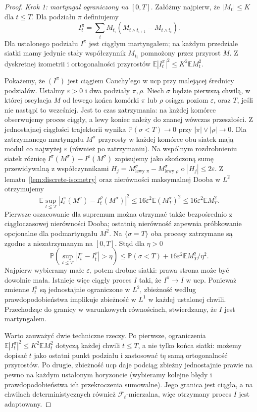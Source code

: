 \documentclass[11pt,a4paper,oneside]{report}
\numberwithin{equation}{chapter}
\theoremstyle{plain}
\theoremstyle{definition}
\theoremstyle{remark}
\newcommand{\Prob}{\mathbb{P}}
\newcommand{\E}{\mathbb{E}}
\newcommand{\calF}{\mathcal{F}}
\begin{document}
\begin{proof}
\emph{Krok 1: martyngał ograniczony na $[0,T]$.}
Załóżmy najpierw, że $|M_t|\le K$ dla $t\le T$.
Dla podziału $\pi$ definiujemy
\[
I_t^\pi=\sum_i M_{t_i}
(M_{t\wedge t_{i+1}}-M_{t\wedge t_i}).
\]
Dla ustalonego podziału $I^\pi$ jest ciągłym martyngałem;
na każdym przedziale siatki mamy jedynie stały
współczynnik $M_{t_i}$ pomnożony przez przyrost $M$.
Z dyskretnej izometrii i ortogonalności przyrostów
$\E|I_t^\pi|^2\le K^2\E M_t^2$.

Pokażemy, że $(I^\pi)$ jest ciągiem Cauchy'ego w
ucp przy malejącej średnicy podziałów. Ustalmy
$\varepsilon>0$ i dwa podziały $\pi,\rho$.
Niech $\sigma$ będzie pierwszą chwilą, w której
oscylacja $M$ od lewego końca komórki $\pi$ lub
$\rho$ osiąga poziom $\varepsilon$, oraz $T$,
jeśli nie nastąpi to wcześniej. Jest to czas zatrzymania:
na każdej komórce obserwujemy proces ciągły,
a lewy koniec należy do znanej wówczas przeszłości.
Z jednostajnej ciągłości trajektorii wynika
$\Prob(\sigma<T)\to0$ przy
$|\pi|\vee|\rho|\to0$.
Dla zatrzymanego martyngału $M^\sigma$ przyrosty
w każdej komórce obu siatek mają moduł co najwyżej
$\varepsilon$ (również po zatrzymaniu).
Na wspólnym rozdrobnieniu siatek różnicę
$I^\pi(M^\sigma)-I^\rho(M^\sigma)$ zapisujemy jako
skończoną sumę przewidywalną z współczynnikami
$H_j=M^\sigma_{\text{lewy }\pi}-
M^\sigma_{\text{lewy }\rho}$ o $|H_j|\le2\varepsilon$.
Z lematu~\ref{lem:discrete-isometry} oraz nierówności
maksymalnej Dooba w $L^2$ otrzymujemy
\[
\E\sup_{t\le T}|I_t^\pi(M^\sigma)-
I_t^\rho(M^\sigma)|^2
\le16\varepsilon^2\E (M^\sigma_T)^2
\le16\varepsilon^2\E M_T^2.
\]
Pierwsze oszacowanie dla supremum można otrzymać także
bezpośrednio z ciągłoczasowej nierówności Dooba;
ostatnią nierówność zapewnia próbkowanie opcjonalne
dla podmartyngału $M^2$.
Na $\{\sigma=T\}$ oba procesy zatrzymane są zgodne
z niezatrzymanym na $[0,T]$. Stąd dla $\eta>0$
\[
\Prob\left(\sup_{t\le T}|I_t^\pi-I_t^\rho|>\eta\right)
\le\Prob(\sigma<T)+16\varepsilon^2\E M_T^2/\eta^2.
\]
Najpierw wybieramy małe $\varepsilon$, potem drobne
siatki: prawa strona może być dowolnie mała.
Istnieje więc ciągły proces $I$ taki, że
$I^\pi\to I$ w ucp.
Ponieważ zmienne $I_t^\pi$ są jednostajnie ograniczone
w $L^2$, zbieżność według prawdopodobieństwa implikuje
zbieżność w $L^1$ w każdej ustalonej chwili.
Przechodząc do granicy w warunkowych równościach,
stwierdzamy, że $I$ jest martyngałem.


Warto zauważyć dwie techniczne rzeczy. Po pierwsze, ograniczenia
$\E|I_t^\pi|^2\le K^2\E M_t^2$ dotyczą każdej chwili $t\le T$,
a nie tylko końca siatki: możemy dopisać $t$ jako ostatni punkt
podziału i zastosować tę samą ortogonalność przyrostów.
Po drugie, zbieżność ucp daje podciąg zbieżny jednostajnie prawie
na pewno na każdym ustalonym horyzoncie (wybieramy kolejne błędy
i prawdopodobieństwa ich przekroczenia sumowalne). Jego granica
jest ciągła, a na chwilach deterministycznych również
$\calF_t$-mierzalna, więc otrzymany proces $I$ jest adaptowany.



\end{proof}
\end{document}
